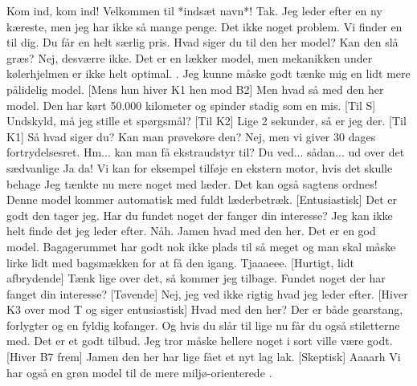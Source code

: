 \documentclass[a4paper,11pt]{article}
\begin{document}
\begin{sketch}




 Kom ind, kom ind! Velkommen til *indsæt navn*! 
 Tak. Jeg leder efter en ny kæreste, men jeg har ikke så mange penge. 
 Det ikke noget problem. Vi finder en til dig. Du får en helt særlig pris. 
 Hvad siger du til den her model? 
 Kan den slå græs?
 Nej, desværre ikke. Det er en lækker model, men mekanikken under kølerhjelmen er ikke helt optimal. .
 Jeg kunne måske godt tænke mig en lidt mere pålidelig model.
[Mens hun hiver K1 hen mod B2] Men hvad så med den her model. Den har kørt 50.000 kilometer og spinder stadig som en mis.
[Til S] Undskyld, må jeg stille et spørgsmål?
[Til K2] Lige 2 sekunder, så er jeg der. 
[Til K1] Så hvad siger du? 
 Kan man prøvekøre den?
 Nej, men vi giver 30 dages fortrydelsesret. 
 Hm... kan man få ekstraudstyr til? Du ved... sådan... ud over det sædvanlige
 Ja da!  Vi kan for eksempel tilføje en ekstern motor, hvis det skulle behage
 Jeg tænkte nu mere noget med læder.
 Det kan også sagtens ordnes!  Denne model kommer automatisk med fuldt læderbetræk.
[Entusiastisk] Det er godt den tager jeg.
 Har du fundet noget der fanger din interesse?
 Jeg kan ikke helt finde det jeg leder efter.
 Nåh. Jamen hvad med den her. Det er en god model. Bagagerummet har godt nok ikke plads til så meget og man skal måske lirke lidt med bagsmækken for at få den igang. 
 Tjaaaeee.
[Hurtigt, lidt afbrydende] Tænk lige over det, så kommer jeg tilbage.  Fundet noget der har fanget din interesse?
[Tøvende] Nej, jeg ved ikke rigtig hvad jeg leder efter.
[Hiver K3 over mod T og siger entusiastisk] Hvad med den her? Der er både gearstang, forlygter og en fyldig kofanger. Og hvis du slår til lige nu får du også stiletterne med. Det er et godt tilbud.
 Jeg tror måske hellere noget i sort ville være godt.
[Hiver B7 frem] Jamen den her har lige fået et nyt lag lak.
[Skeptisk] Aaaarh 
 Vi har også en grøn model til de mere miljø-orienterede . 

\end{sketch}
\end{document}
